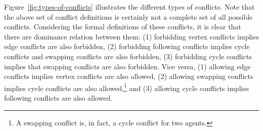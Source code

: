 \documentclass[letterpaper]{article} %
\newcommand{\comment}[1]{{\nb{\textbf{Comment:}}{orange}{#1}}}
\begin{document}
Figure~\ref{fig:types-of-conflicts} illustrates the different types of conflicts. Note that the above set of conflict definitions is certainly not a complete set of all possible conflicts.
Considering the formal definitions of these conflicts, it is clear that there are dominance relation between them: (1) forbidding vertex conflicts implies edge conflicts are also forbidden, (2) forbidding following conflicts implies cycle conflicts and swapping conflicts are also forbidden, (3) forbidding cycle conflicts implies that swapping conflicts are also forbidden. Vice versa, (1) allowing edge conflicts implies vertex conflicts are also allowed,
(2) allowing swapping conflicts implies cycle conflicts are also allowed,\footnote{A swapping conflict is, in fact, a cycle conflict for two agents.}
and (3) allowing cycle conflicts implies following conflicts are also allowed.



\end{document}
